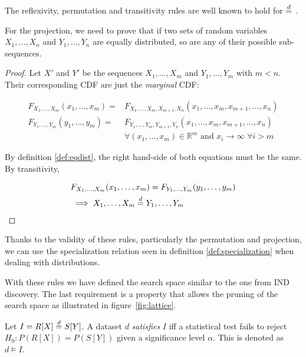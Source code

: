 The reflexivity, permutation and transitivity rules are well known to hold
for $\stackrel{d}{=}$ \cite{randles1979introduction}.

For the projection, we need to prove that if two sets of random variables
$X_1,\dots,X_n$ and $Y_1,\dots,Y_n$ are equally distributed, so are
any of their possible sub-sequences.

\begin{proof}
Let $X'$ and $Y'$ be the sequences $X_1,\dots,X_m$ and $Y_1,\dots,Y_m$ with $m < n$.
Their corresponding  \gls{CDF} are just the \emph{marginal} \gls{CDF}:

\begin{equation}
\begin{split}
    F_{X_1,\dots,X_m}(x_1,\dots,x_m) = & F_{X_1,\dots,X_m,X_{m+1},X_n}(x_1,\dots,x_m,x_{m+1},\dots,x_n) \\
    F_{Y_1,\dots,Y_m}(y_1,\dots,y_m) =& F_{Y_1,\dots,Y_m,Y_{m+1},Y_n}(x_1,\dots,x_m,x_{m+1},\dots,x_n)\\
    & \forall (x_1,\dots,x_m) \in \mathbb{R}^m \textrm{ and } x_i \xrightarrow{} \infty \; \forall i > m
\end{split}
\end{equation}

By definition \ref{def:eqdist}, the right hand-side of both equations must be the same.
By transitivity, 

\begin{equation}
\begin{split}
    & F_{X_1,\dots,X_m}(x_1,\dots,x_m) = F_{Y_1,\dots,Y_m}(y_1,\dots,y_m) \\
    & \implies X_1,\dots,X_m \stackrel{d}{=} Y_1,\dots,Y_m
\end{split}
\end{equation}

\end{proof}

Thanks to the validity of these rules, particularly the permutation and projection,
we can use the specialization relation seen in definition \ref{def:specialization}
when dealing with distributions.

With these rules we have defined the search space similar to the one from \gls{IND} discovery.
The last requirement is a property that allows the pruning of the
search space as illustrated in figure~\ref{fig:lattice}.

Let $I = R[X] \stackrel{d}{=} S[Y]$.
A dataset $d$ \emph{satisfies} $I$ iff  a statistical test fails to reject $H_0: P(R[X]) = P(S[Y])$
given a significance level $\alpha$.
This is denoted as $d \models I$.

